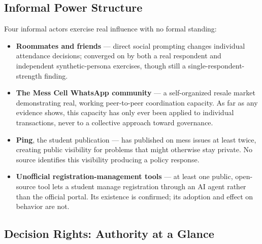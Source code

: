 \documentclass[11pt]{article}
\begin{document}
\subsection{Informal Power Structure}

Four informal actors exercise real influence with no formal standing:

\begin{itemize}
    \item \textbf{Roommates and friends} --- direct social prompting changes
        individual attendance decisions; converged on by both a real respondent and
        independent synthetic-persona exercises, though still a single-respondent-strength
        finding.
    \item \textbf{The Mess Cell WhatsApp community} --- a self-organized resale
        market demonstrating real, working peer-to-peer coordination capacity. As far
        as any evidence shows, this capacity has only ever been applied to individual
        transactions, never to a collective approach toward governance.
    \item \textbf{Ping}, the student publication --- has published on mess issues at
        least twice, creating public visibility for problems that might otherwise
        stay private. No source identifies this visibility producing a policy
        response.
    \item \textbf{Unofficial registration-management tools} --- at least one public,
        open-source tool lets a student manage registration through an AI agent
        rather than the official portal. Its existence is confirmed; its adoption and
        effect on behavior are not.
\end{itemize}

\subsection{Decision Rights: Authority at a Glance}
\end{document}

